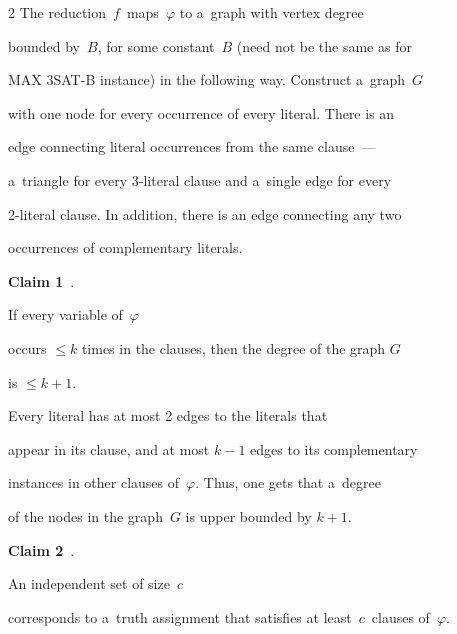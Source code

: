 \begin{multicols}{2}
The reduction~$f$~maps~$\varphi$ to a~graph with vertex degree


bounded by~$B$, for some constant~$B$ (need not be the same as for


MAX 3SAT-B instance) in the following way. Construct a~graph~$G$


with one node for every occurrence of every literal. There is an


edge connecting literal occurrences from the same clause~---


a~triangle for every 3-literal clause and a~single edge for every


2-literal clause. In addition, there is an edge connecting any two


occurrences of complementary literals.





\smallskip





\noindent


\textbf{Claim 1}~\cite{MSAT3Example, P1994}.


If every variable of~$\varphi$


occurs $\leq k$ times in the clauses, then the degree of the graph $G$


is $\leq k + 1$.





\smallskip





Every literal has at most 2 edges to the literals that


appear in its clause, and at most $k-1$ edges to its complementary


instances in other clauses of~$\varphi$. Thus, one gets that a~degree


of the nodes in the graph~$G$ is upper bounded by $k+1$.





\smallskip





\noindent


\textbf{Claim 2}~\cite{MSAT3Example, P1994}.


An independent set of size~$c$


corresponds to a~truth assignment that satisfies at least~$c$~clauses of~$\varphi$.






\end{multicols}
